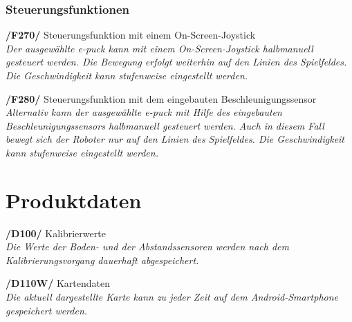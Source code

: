 \documentclass[10pt,a4paper]{article}
\let\oldsection\section
\renewcommand{\section}{\newpage \oldsection}
\begin{document}
			\subsubsection{Steuerungsfunktionen}		
				\begin{list}{}{\leftmargin=1cm}
					\item[\textbf{/F270/}] Steuerungsfunktion mit einem On-Screen-Joystick
						\\ \textsl{Der ausgewählte e-puck kann mit einem On-Screen-Joystick halbmanuell gesteuert werden. Die Bewegung
							erfolgt weiterhin auf den Linien des Spielfeldes. Die Geschwindigkeit kann stufenweise eingestellt werden.}	
					\item[\textbf{/F280/}] Steuerungsfunktion mit dem eingebauten Beschleunigungssensor
						\\ \textsl{Alternativ kann der ausgewählte e-puck mit Hilfe des eingebauten Beschleunigungssensors halbmanuell
						gesteuert werden. Auch in diesem Fall bewegt sich der Roboter nur auf den Linien des Spielfeldes. Die Geschwindigkeit
						kann stufenweise eingestellt werden.}					
				\end{list}						
	\section{Produktdaten}
		\begin{list}{}{\leftmargin=1cm}
			\item[\textbf{/D100/}] Kalibrierwerte
				\\ \textsl{Die Werte der Boden- und der Abstandssensoren werden nach dem Kalibrierungsvorgang dauerhaft abgespeichert.}
		\end{list}
		\begin{list}{}{\leftmargin=1cm}
			\item[\textbf{/D110W/}] Kartendaten
				\\ \textsl{Die aktuell dargestellte Karte kann zu jeder Zeit auf dem Android-Smartphone gespeichert werden.}
		\end{list}
		
\end{document}
